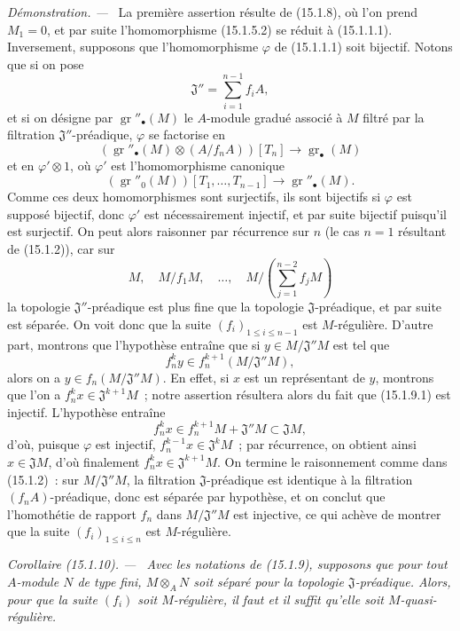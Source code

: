 \documentclass[10pt,oneside]{book}
\makeatletter
\newcommand{\gr}{\operatorname{gr}}
\newcommand{\setmanualcurrentlabel}[1]{\def\@currentlabel{#1}}
\newcommand{\oldpage}[2][]{%
  \setcounter{footnote}{0}%
  \marginpar{\scriptsize\textbf{#1}~|~#2}\ignorespaces}
\newenvironment{corollary}[1][]{%
  \setmanualcurrentlabel{#1}\par\medskip\noindent\itshape Corollaire (#1). ---\ }{\par}
\newenvironment{proof}{%
  \par\medskip\noindent\textit{Démonstration. ---\ }}{\par}
\makeatother
\begin{document}
\begin{proof}
La première assertion résulte de (15.1.8), où l'on prend $M_1=0$, et par suite
l'homomorphisme (15.1.5.2) se réduit à (15.1.1.1). Inversement, supposons que
l'homomorphisme $\varphi$ de (15.1.1.1) soit bijectif. Notons que si on pose
\[
  \mathfrak{J}''=\sum_{i=1}^{n-1}f_iA,
\]
\oldpage[0\textsubscript{IV-1}]{16}
et si on désigne par $\gr''_\bullet(M)$ le $A$-module gradué associé à $M$
filtré par la filtration $\mathfrak{J}''$-préadique, $\varphi$ se factorise en
\[
  (\gr''_\bullet(M)\otimes(A/f_nA))[T_n]\longrightarrow\gr_\bullet(M)
  \tag{15.1.9.1}\label{0.15.1.9.1-fr}
\]
et en $\varphi'\otimes1$, où $\varphi'$ est l'homomorphisme canonique
\[
  (\gr''_0(M))[T_1,\ldots,T_{n-1}]
  \longrightarrow\gr''_\bullet(M).
\]
Comme ces deux homomorphismes sont surjectifs, ils sont bijectifs si
$\varphi$ est supposé bijectif, donc $\varphi'$ est nécessairement injectif,
et par suite bijectif puisqu'il est surjectif. On peut alors raisonner par
récurrence sur $n$ (le cas $n=1$ résultant de (15.1.2)), car sur
\[
  M,\quad M/f_1M,\quad\ldots,\quad
  M/\left(\sum_{j=1}^{n-2}f_jM\right)
\]
la topologie $\mathfrak{J}''$-préadique est plus fine que la topologie
$\mathfrak{J}$-préadique, et par suite est séparée. On voit donc que la suite
$(f_i)_{1\leq i\leq n-1}$ est $M$-régulière. D'autre part, montrons que
l'hypothèse entraîne que si $y\in M/\mathfrak{J}''M$ est tel que
\[
  f_n^ky\in f_n^{k+1}(M/\mathfrak{J}''M),
\]
alors on a $y\in f_n(M/\mathfrak{J}''M)$. En effet, si $x$ est un représentant
de $y$, montrons que l'on a $f_n^kx\in\mathfrak{J}^{k+1}M$~; notre assertion
résultera alors du fait que (15.1.9.1) est injectif. L'hypothèse entraîne
\[
  f_n^kx\in f_n^{k+1}M+\mathfrak{J}''M\subset\mathfrak{J}M,
\]
d'où, puisque $\varphi$ est injectif,
$f_n^{k-1}x\in\mathfrak{J}^kM$~; par récurrence, on obtient ainsi
$x\in\mathfrak{J}M$, d'où finalement
$f_n^kx\in\mathfrak{J}^{k+1}M$. On termine le raisonnement comme dans
(15.1.2)~: sur $M/\mathfrak{J}''M$, la filtration
$\mathfrak{J}$-préadique est identique à la filtration
$(f_nA)$-préadique, donc est séparée par hypothèse, et on conclut que
l'homothétie de rapport $f_n$ dans $M/\mathfrak{J}''M$ est injective, ce qui
achève de montrer que la suite $(f_i)_{1\leq i\leq n}$ est $M$-régulière.
\end{proof}

\begin{corollary}[15.1.10]
\label{0.15.1.10-fr}
Avec les notations de (15.1.9), supposons que pour tout $A$-module $N$ de type
fini, $M\otimes_A N$ soit séparé pour la topologie
$\mathfrak{J}$-préadique. Alors, pour que la suite $(f_i)$ soit
$M$-régulière, il faut et il suffit qu'elle soit $M$-quasi-régulière.
\end{corollary}
\end{document}
